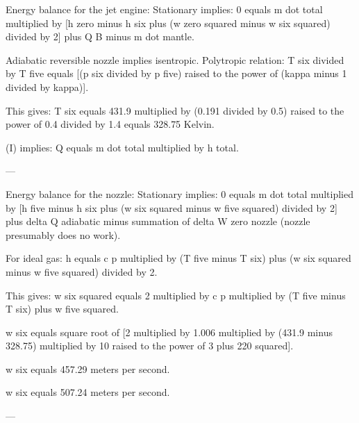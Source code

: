 Energy balance for the jet engine:  
Stationary implies:  
0 equals m dot total multiplied by [h zero minus h six plus (w zero squared minus w six squared) divided by 2] plus Q B minus m dot mantle.  

Adiabatic reversible nozzle implies isentropic.  
Polytropic relation:  
T six divided by T five equals [(p six divided by p five) raised to the power of (kappa minus 1 divided by kappa)].  

This gives:  
T six equals 431.9 multiplied by (0.191 divided by 0.5) raised to the power of 0.4 divided by 1.4 equals 328.75 Kelvin.  

(I) implies:  
Q equals m dot total multiplied by h total.  

---

Energy balance for the nozzle:  
Stationary implies:  
0 equals m dot total multiplied by [h five minus h six plus (w six squared minus w five squared) divided by 2] plus delta Q adiabatic minus summation of delta W zero nozzle (nozzle presumably does no work).  

For ideal gas:  
h equals c p multiplied by (T five minus T six) plus (w six squared minus w five squared) divided by 2.  

This gives:  
w six squared equals 2 multiplied by c p multiplied by (T five minus T six) plus w five squared.  

w six equals square root of [2 multiplied by 1.006 multiplied by (431.9 minus 328.75) multiplied by 10 raised to the power of 3 plus 220 squared].  

w six equals 457.29 meters per second.  

w six equals 507.24 meters per second.  

---